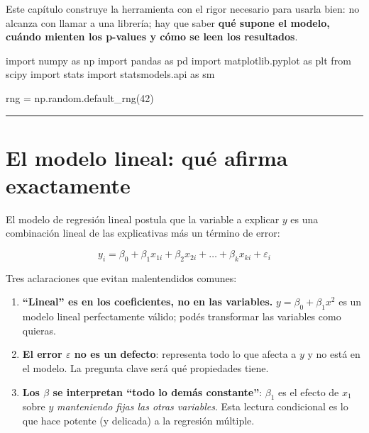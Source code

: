 \documentclass[
  spanish,
  letterpaper,
  DIV=11,
  numbers=noendperiod]{scrreprt}
\newenvironment{Shaded}{\begin{snugshade}}{\end{snugshade}}
\newcommand{\DecValTok}[1]{\textcolor[rgb]{0.68,0.00,0.00}{#1}}
\newcommand{\ImportTok}[1]{\textcolor[rgb]{0.00,0.46,0.62}{#1}}
\newcommand{\NormalTok}[1]{\textcolor[rgb]{0.00,0.23,0.31}{#1}}
\newcommand{\OperatorTok}[1]{\textcolor[rgb]{0.37,0.37,0.37}{#1}}
\providecommand{\tightlist}{%
  \setlength{\itemsep}{0pt}\setlength{\parskip}{0pt}}
\begin{document}
Este capítulo construye la herramienta con el rigor necesario para
usarla bien: no alcanza con llamar a una librería; hay que saber
\textbf{qué supone el modelo, cuándo mienten los p-values y cómo se leen
los resultados}.

\label{setup}
\begin{Shaded}
\begin{Highlighting}[]
\ImportTok{import}\NormalTok{ numpy }\ImportTok{as}\NormalTok{ np}
\ImportTok{import}\NormalTok{ pandas }\ImportTok{as}\NormalTok{ pd}
\ImportTok{import}\NormalTok{ matplotlib.pyplot }\ImportTok{as}\NormalTok{ plt}
\ImportTok{from}\NormalTok{ scipy }\ImportTok{import}\NormalTok{ stats}
\ImportTok{import}\NormalTok{ statsmodels.api }\ImportTok{as}\NormalTok{ sm}

\NormalTok{rng }\OperatorTok{=}\NormalTok{ np.random.default\_rng(}\DecValTok{42}\NormalTok{)}
\end{Highlighting}
\end{Shaded}

\begin{center}\rule{0.5\linewidth}{0.5pt}\end{center}

\chapter{El modelo lineal: qué afirma
exactamente}\label{el-modelo-lineal-quuxe9-afirma-exactamente}

El modelo de regresión lineal postula que la variable a explicar \(y\)
es una combinación lineal de las explicativas más un término de error:

\[y_i = \beta_0 + \beta_1 x_{1i} + \beta_2 x_{2i} + \dots + \beta_k x_{ki} + \varepsilon_i\]

Tres aclaraciones que evitan malentendidos comunes:

\begin{enumerate}
\def\labelenumi{\arabic{enumi}.}
\tightlist
\item
  \textbf{``Lineal'' es en los coeficientes, no en las variables.}
  \(y = \beta_0 + \beta_1 x^2\) es un modelo lineal perfectamente
  válido; podés transformar las variables como quieras.
\item
  \textbf{El error \(\varepsilon\) no es un defecto}: representa todo lo
  que afecta a \(y\) y no está en el modelo. La pregunta clave será qué
  propiedades tiene.
\item
  \textbf{Los \(\beta\) se interpretan ``todo lo demás constante''}:
  \(\beta_1\) es el efecto de \(x_1\) sobre \(y\) \emph{manteniendo
  fijas las otras variables}. Esta lectura condicional es lo que hace
  potente (y delicada) a la regresión múltiple.
\end{enumerate}
\end{document}
